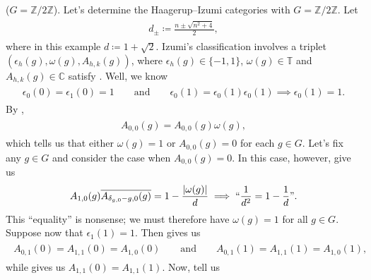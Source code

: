 \noindent\begin{example}\label{UHIZ2}\textup{($G = \mathbb{Z}/2\mathbb{Z}$).} Let's determine the Haagerup--Izumi categories with $G = \mathbb{Z}/2\mathbb{Z}$. Let
\begin{align*}
\begin{split}
d_\pm \coloneqq \frac{n \pm \sqrt{n^2 + 4}}{2},
\end{split}
\end{align*}
\noindent where in this example $d \coloneqq 1 + \sqrt{2}$. Izumi's classification involves a triplet $(\epsilon_h(g), \omega(g), A_{h,k}(g))$, where $\epsilon_h(g) \in \{-1, 1\}$, $\omega(g) \in \mathbb{T}$ and $A_{h,k}(g) \in \mathbb{C}$ satisfy \cite[Equations (4.1)--(4.9)]{Izu18}. Well, we know
\begin{align*}
\begin{split}
\epsilon_0(0) = \epsilon_1(0) = 1\qquad\text{and}\qquad\epsilon_0(1) = \epsilon_0(1)\epsilon_0(1) \implies \epsilon_0(1) = 1.
\end{split}
\end{align*}
\noindent By \cite[Equation (4.7)]{Izu18},
\begin{align*}
\begin{split}
A_{0,0}(g) = A_{0,0}(g)\omega(g),
\end{split}
\end{align*}
\noindent which tells us that either $\omega(g) = 1$ or $A_{0,0}(g) = 0$ for each $g \in G$. Let's fix any $g \in G$ and consider the case when $A_{0,0}(g) = 0$. In this case, however, \cite[Equations (4.3) and (4.4)]{Izu18} give us
\begin{align*}
\begin{split}
A_{1,0}(g)\overline{A_{\delta_{g,0}-g,0}(g)} = 1 - \frac{\lvert\omega(g)\rvert}{d} \implies \text{``}\frac{1}{d^2} = 1 - \frac{1}{d}\text{''}.
\end{split}
\end{align*}
\noindent This ``equality'' is nonsense; we must therefore have $\omega(g) = 1$ for all $g \in G$. Suppose now that $\epsilon_1(1) = 1$. Then \cite[Equation (4.7)]{Izu18} gives us
\begin{align*}
\begin{split}
A_{0,1}(0) = A_{1,1}(0) = A_{1,0}(0)\qquad\text{and}\qquad A_{0,1}(1) = A_{1,1}(1) = A_{1,0}(1),
\end{split}
\end{align*}
\noindent while \cite[Equation (4.8)]{Izu18} gives us $A_{1,1}(0) = A_{1,1}(1)$. Now, \cite[Equations (4.4) and (4.6)]{Izu18} tell us

\end{example}
